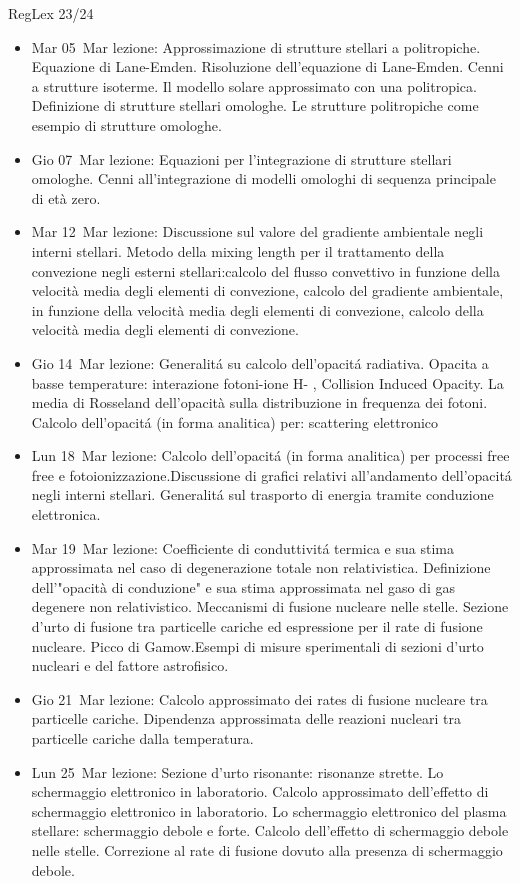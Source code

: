 \begin{frame}[allowframebreaks]{RegLex 23/24}
\begin{itemize}
\item Mar 05 Mar lezione: Approssimazione di strutture stellari a politropiche. Equazione di Lane-Emden. Risoluzione dell'equazione di Lane-Emden. Cenni a strutture isoterme. Il modello solare approssimato con una politropica. Definizione di strutture stellari omologhe. Le strutture politropiche come esempio di strutture omologhe. 
\item Gio 07 Mar lezione: Equazioni per l'integrazione di strutture stellari omologhe. Cenni all'integrazione di modelli omologhi di sequenza principale di età zero. 
\item Mar 12 Mar lezione: Discussione sul valore del gradiente ambientale negli interni stellari. Metodo della mixing length per il trattamento della convezione negli esterni stellari:calcolo del flusso convettivo in funzione della velocità media degli elementi di convezione, calcolo del gradiente ambientale, in funzione della velocità media degli elementi di convezione, calcolo della velocità media degli elementi di convezione. 
\item Gio 14 Mar lezione: Generalit\'a su calcolo dell'opacit\'a radiativa. Opacita a basse temperature: interazione fotoni-ione H- , Collision Induced Opacity. La media di Rosseland dell'opacità sulla distribuzione in frequenza dei fotoni. Calcolo dell'opacit\'a (in forma analitica) per: scattering elettronico 
\item Lun 18 Mar lezione: Calcolo dell'opacit\'a (in forma analitica) per processi free free e fotoionizzazione.Discussione di grafici relativi all'andamento dell'opacit\'a negli interni stellari. Generalit\'a sul trasporto di energia tramite conduzione elettronica. 
\item Mar 19 Mar lezione: Coefficiente di conduttivit\'a termica e sua stima approssimata nel caso di degenerazione totale non relativistica. Definizione dell'"opacità di conduzione" e sua stima approssimata nel gaso di gas degenere non relativistico. Meccanismi di fusione nucleare nelle stelle. Sezione d'urto di fusione tra particelle cariche ed espressione per il rate di fusione nucleare. Picco di Gamow.Esempi di misure sperimentali di sezioni d'urto nucleari e del fattore astrofisico. 
\item Gio 21 Mar lezione: Calcolo approssimato dei rates di fusione nucleare tra particelle cariche. Dipendenza approssimata delle reazioni nucleari tra particelle cariche dalla temperatura. 
\item Lun 25 Mar lezione: Sezione d'urto risonante: risonanze strette. Lo schermaggio elettronico in laboratorio. Calcolo approssimato dell'effetto di schermaggio elettronico in laboratorio. Lo schermaggio elettronico del plasma stellare: schermaggio debole e forte. Calcolo dell'effetto di schermaggio debole nelle stelle. Correzione al rate di fusione dovuto alla presenza di schermaggio debole. 

\end{itemize}
\end{frame}
